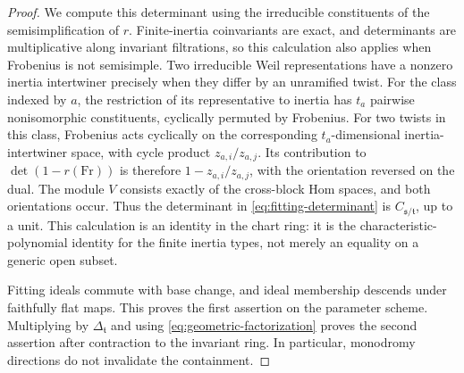 \documentclass[11pt,a4paper]{amsart}
\theoremstyle{definition}
\theoremstyle{remark}
\newcommand{\grs}{\mathfrak s}
\newcommand{\grt}{\mathfrak t}
\begin{document}
\begin{proof}
We compute this determinant using the irreducible constituents of
the semisimplification of $r$. Finite-inertia coinvariants are exact,
and determinants are multiplicative along invariant filtrations,
so this calculation also applies when Frobenius is not semisimple.
Two irreducible Weil representations have a nonzero inertia
intertwiner precisely when they differ by an unramified twist.
For the class indexed by $a$, the restriction of its representative
to inertia has $t_a$ pairwise nonisomorphic constituents, cyclically
permuted by Frobenius. For two twists in this class, Frobenius acts
cyclically on the corresponding $t_a$-dimensional inertia-intertwiner
space, with cycle product $z_{a,i}/z_{a,j}$. Its contribution to
$\det(1-r(\mathrm{Fr}))$ is therefore
$1-z_{a,i}/z_{a,j}$, with the orientation reversed on the dual.
The module $V$ consists exactly of the cross-block Hom spaces,
and both orientations occur. Thus the determinant in
\eqref{eq:fitting-determinant} is $C_{\grs/\grt}$, up to a unit.
This calculation is an identity in the chart ring: it is the
characteristic-polynomial identity for the finite inertia types,
not merely an equality on a generic open subset.

Fitting ideals commute with base change, and ideal membership
descends under faithfully flat maps. This proves the first assertion
on the parameter scheme. Multiplying by $\Delta_{\grt}$ and using
\eqref{eq:geometric-factorization} proves the second assertion after
contraction to the invariant ring. In particular, monodromy directions
do not invalidate the containment.
\end{proof}
\end{document}
